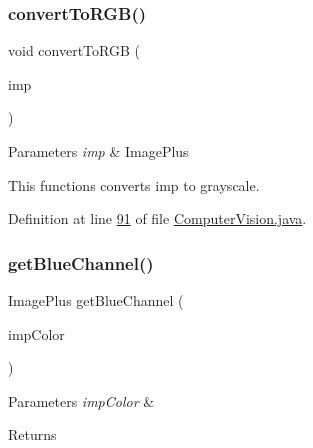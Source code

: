 \hypertarget{classfunctions_1_1_computer_vision_a98a9ec9a4b8c6a28678d649822a73bc8}{}\label{classfunctions_1_1_computer_vision_a98a9ec9a4b8c6a28678d649822a73bc8} 
\subsubsection{\texorpdfstring{convert\+To\+R\+G\+B()}{convertToRGB()}}
{\footnotesize\ttfamily void convert\+To\+R\+GB (\begin{DoxyParamCaption}\item[{Image\+Plus}]{imp }\end{DoxyParamCaption})}


\begin{DoxyParams}{Parameters}
{\em imp} & Image\+Plus\\
\hline
\end{DoxyParams}
This functions converts imp to grayscale. 

Definition at line \hyperlink{_computer_vision_8java_source_l00091}{91} of file \hyperlink{_computer_vision_8java_source}{Computer\+Vision.\+java}.

\hypertarget{classfunctions_1_1_computer_vision_a8569abc8aa379c890c8332eda42095be}{}\label{classfunctions_1_1_computer_vision_a8569abc8aa379c890c8332eda42095be} 
\subsubsection{\texorpdfstring{get\+Blue\+Channel()}{getBlueChannel()}}
{\footnotesize\ttfamily Image\+Plus get\+Blue\+Channel (\begin{DoxyParamCaption}\item[{Image\+Plus}]{imp\+Color }\end{DoxyParamCaption})}


\begin{DoxyParams}{Parameters}
{\em imp\+Color} & \\
\hline
\end{DoxyParams}
\begin{DoxyReturn}{Returns}

\end{DoxyReturn}


